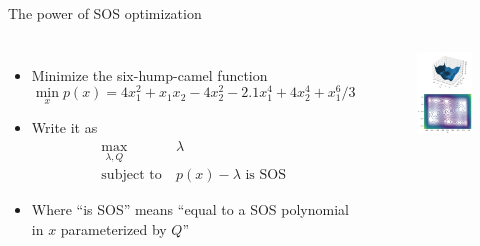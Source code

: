 \documentclass[aspectratio=169]{beamer}
\begin{document}
\begin{frame}{The power of SOS optimization \href{https://colab.research.google.com/github/TobiaMarcucci/optimal_control_pisa/blob/master/demos/six_hump_camel.ipynb}{}}
\begin{columns}
\begin{itemize}
\item
Minimize the six-hump-camel function
$$
\min_x p(x) = 4 x_1^2 + x_1 x_2 - 4 x_2^2 - 2.1 x_1^4 + 4 x_2^4 + x_1^6 / 3
$$
\item
Write it as
\begin{align*}
\max_{ \lambda, Q} \ & \lambda \\
\text{subject to} \ &  p(x) - \lambda \text{ is SOS}
\end{align*}
\item
Where ``is SOS'' means ``equal to a SOS polynomial in $x$ parameterized by $Q$''
\end{itemize}
\vspace{-5mm}
\begin{figure}
\includegraphics[width=\columnwidth]{figures/camel.pdf}
\end{figure}
\end{columns}
\end{frame}
\end{document}
